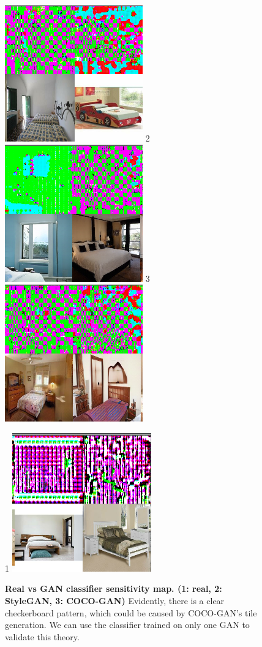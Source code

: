 \documentclass{article}
\begin{document}
        \begin{figure}[H]
          \includegraphics[scale=0.25]{smoothgrad/combined/real.png}
          2
          \includegraphics[scale=0.25]{smoothgrad/combined/stylegan.png}
          3
          \includegraphics[scale=0.25]{smoothgrad/combined/coco.png}
          \caption{\textbf{Real vs GAN classifier sensitivity map. (1: real, 2: StyleGAN, 3: COCO-GAN)} Evidently, there is a clear checkerboard pattern, which could be caused by COCO-GAN's tile generation\cite{cocogan}. 
        We can use the classifier trained on only one GAN to validate this theory.\\}
            1
            \includegraphics[scale=0.25]{smoothgrad/stylegan/real.png}

\end{figure}
\end{document}
